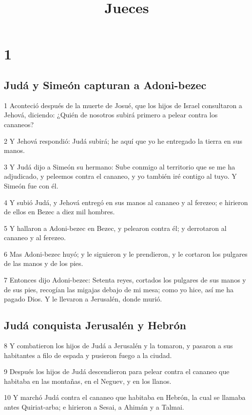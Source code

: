 

\title{Jueces}

\chapter{1}

\section*{Judá y Simeón capturan a Adoni-bezec}

\par 1 Aconteció después de la muerte de Josué, que los hijos de Israel consultaron a Jehová, diciendo: ¿Quién de nosotros subirá primero a pelear contra los cananeos?
\par 2 Y Jehová respondió: Judá subirá; he aquí que yo he entregado la tierra en sus manos.
\par 3 Y Judá dijo a Simeón su hermano: Sube conmigo al territorio que se me ha adjudicado, y peleemos contra el cananeo, y yo también iré contigo al tuyo. Y Simeón fue con él.
\par 4 Y subió Judá, y Jehová entregó en sus manos al cananeo y al ferezeo; e hirieron de ellos en Bezec a diez mil hombres.
\par 5 Y hallaron a Adoni-bezec en Bezec, y pelearon contra él; y derrotaron al cananeo y al ferezeo.
\par 6 Mas Adoni-bezec huyó; y le siguieron y le prendieron, y le cortaron los pulgares de las manos y de los pies.
\par 7 Entonces dijo Adoni-bezec: Setenta reyes, cortados los pulgares de sus manos y de sus pies, recogían las migajas debajo de mi mesa; como yo hice, así me ha pagado Dios. Y le llevaron a Jerusalén, donde murió.

\section*{Judá conquista Jerusalén y Hebrón}

\par 8 Y combatieron los hijos de Judá a Jerusalén y la tomaron, y pasaron a sus habitantes a filo de espada y pusieron fuego a la ciudad.
\par 9 Después los hijos de Judá descendieron para pelear contra el cananeo que habitaba en las montañas, en el Neguev, y en los llanos.
\par 10 Y marchó Judá contra el cananeo que habitaba en Hebrón, la cual se llamaba antes Quiriat-arba; e hirieron a Sesai, a Ahimán y a Talmai.

